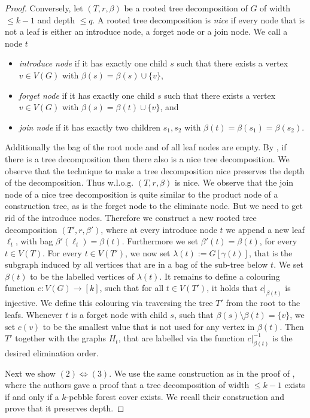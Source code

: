 \documentclass[10pt,a4paper]{article}
\begin{document}
\begin{proof}
	Conversely, let $(T,r,\beta)$ be a rooted tree decomposition of $G$ of width $\leq k-1$ and depth $\leq q$.
	A rooted tree decomposition is \emph{nice} if every node that is not a leaf is either an introduce node, a forget node or a join node.
	We call a node $t$ 
	\begin{itemize}
		\item \emph{introduce node} if it has exactly one child $s$ such that there exists a vertex $v\in V(G)$ with $\beta(s)=\beta(s)\cup \{v\} $,
		\item \emph{forget node} if it has exactly one child $s$ such that there exists a vertex $v\in V(G)$ with $\beta(s)=\beta(t)\cup \{v\}$, and 
		\item \emph{join node} if it has exactly two children $s_1,s_2$ with $\beta(t)=\beta(s_1)=\beta(s_2)$.
	\end{itemize}
	Additionally the bag of the root node and of all leaf nodes are empty.
	By \cite{bodlaender_partial_1998}, if there is a tree decomposition then there also is a nice tree decomposition.
	We observe that the technique to make a tree decomposition nice preserves the depth of the decomposition.
	Thus w.l.o.g. $(T,r,\beta)$ is nice.
	We observe that the join node of a nice tree decomposition is quite similar to the product node of a construction tree, as is the forget node to the eliminate node.
	But we need to get rid of the introduce nodes.
	Therefore we construct a new rooted tree decomposition $(T',r,\beta')$, where at every introduce node $t$ we append a new leaf $\ell_t$, with bag $\beta'(\ell_t)=\beta(t)$.
	Furthermore we set $\beta'(t)=\beta(t)$, for every $t\in V(T)$.
	For every $t\in V(T')$, we now set $\lambda(t):=G[\gamma(t)]$, that is the subgraph induced by all vertices that are in a bag of the sub-tree below $t$.
	We set $\beta(t)$ to be the labelled vertices of $\lambda(t)$.
	It remains to define a colouring function $c\colon V(G)\rightarrow [k]$, such that for all $t\in V(T')$, it holds that $c|_{\beta(t)}$ is injective.
	We define this colouring via traversing the tree $T'$ from the root to the leafs.
	Whenever $t$ is a forget node with child $s$, such that $\beta(s)\setminus\beta(t)=\{v\}$, we set $c(v)$ to be the smallest value that is not used for any vertex in $\beta(t)$.
	Then $T'$ together with the graphs $H_t$, that are labelled via the function $c|_{\beta(t)}^{-1}$ is the desired elimination order.
	
	Next we show $(2)\Leftrightarrow (3)$.
	We use the same construction as in the proof of \cite[Theorem~19]{abramsky_relating_2021}, where the authors gave a proof that a tree decomposition of width $\leq k-1$ exists if and only if a $k$-pebble forest cover exists.
	We recall their construction and prove that it preserves depth.
	

\end{proof}
\end{document}
